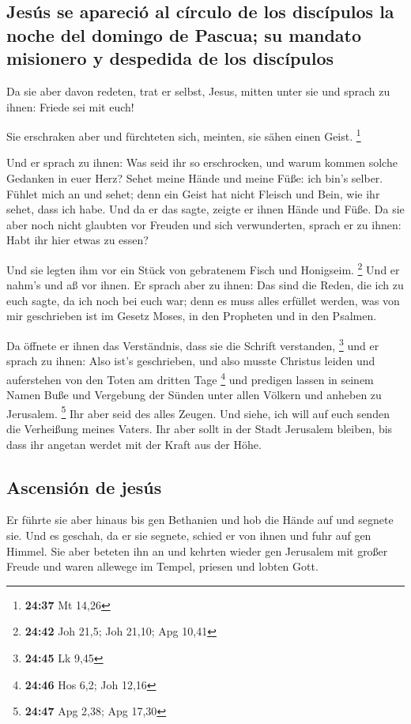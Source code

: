\hypertarget{jesuxfas-se-apareciuxf3-al-cuxedrculo-de-los-discuxedpulos-la-noche-del-domingo-de-pascua-su-mandato-misionero-y-despedida-de-los-discuxedpulos}{%
\subsection{Jesús se apareció al círculo de los discípulos la noche del
domingo de Pascua; su mandato misionero y despedida de los
discípulos}\label{jesuxfas-se-apareciuxf3-al-cuxedrculo-de-los-discuxedpulos-la-noche-del-domingo-de-pascua-su-mandato-misionero-y-despedida-de-los-discuxedpulos}}

 Da sie aber davon redeten, trat er selbst, Jesus, mitten
unter sie und sprach zu ihnen: Friede sei mit euch!

 Sie erschraken aber und fürchteten sich, meinten, sie
sähen einen Geist. \footnote{\textbf{24:37} Mt 14,26}

 Und er sprach zu ihnen: Was seid ihr so erschrocken, und
warum kommen solche Gedanken in euer Herz?  Sehet meine
Hände und meine Füße: ich bin's selber. Fühlet mich an und sehet; denn
ein Geist hat nicht Fleisch und Bein, wie ihr sehet, dass ich habe.
 Und da er das sagte, zeigte er ihnen Hände und Füße.
 Da sie aber noch nicht glaubten vor Freuden und sich
verwunderten, sprach er zu ihnen: Habt ihr hier etwas zu essen?

 Und sie legten ihm vor ein Stück von gebratenem Fisch
und Honigseim. \footnote{\textbf{24:42} Joh 21,5; Joh 21,10; Apg 10,41}
 Und er nahm's und aß vor ihnen.  Er
sprach aber zu ihnen: Das sind die Reden, die ich zu euch sagte, da ich
noch bei euch war; denn es muss alles erfüllet werden, was von mir
geschrieben ist im Gesetz Moses, in den Propheten und in den Psalmen.

 Da öffnete er ihnen das Verständnis, dass sie die
Schrift verstanden, \footnote{\textbf{24:45} Lk 9,45} 
und er sprach zu ihnen: Also ist's geschrieben, und also musste Christus
leiden und auferstehen von den Toten am dritten Tage \footnote{\textbf{24:46}
  Hos 6,2; Joh 12,16}  und predigen lassen in seinem
Namen Buße und Vergebung der Sünden unter allen Völkern und anheben zu
Jerusalem. \footnote{\textbf{24:47} Apg 2,38; Apg 17,30} 
Ihr aber seid des alles Zeugen.  Und siehe, ich will auf
euch senden die Verheißung meines Vaters. Ihr aber sollt in der Stadt
Jerusalem bleiben, bis dass ihr angetan werdet mit der Kraft aus der
Höhe.

\hypertarget{ascensiuxf3n-de-jesuxfas}{%
\subsection{Ascensión de jesús}\label{ascensiuxf3n-de-jesuxfas}}

 Er führte sie aber hinaus bis gen Bethanien und hob die
Hände auf und segnete sie.  Und es geschah, da er sie
segnete, schied er von ihnen und fuhr auf gen Himmel. 
Sie aber beteten ihn an und kehrten wieder gen Jerusalem mit großer
Freude  und waren allewege im Tempel, priesen und lobten
Gott.
